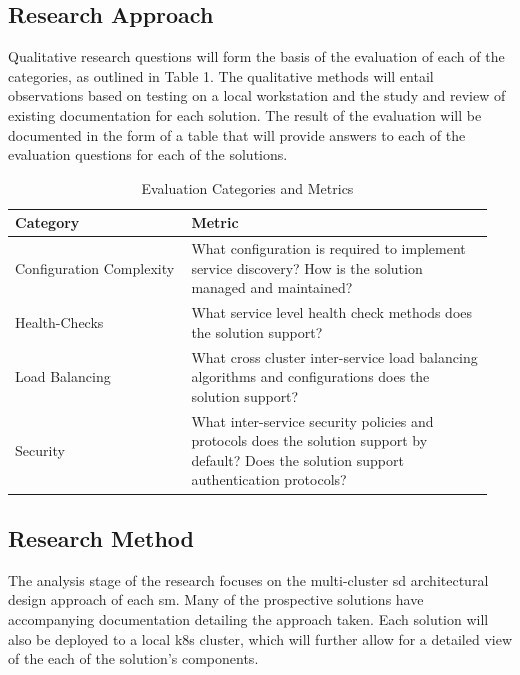 \documentclass[12pt, a4paper, oneside]{article}
\begin{document}
\subsection{Research Approach}
Qualitative research questions will form the basis of the evaluation of each of the categories, as outlined in Table 1. The qualitative methods will entail observations based on testing on a local workstation and the study and review of existing documentation for each solution. The result of the evaluation will be documented in the form of a table that will provide answers to each of the evaluation questions for each of the solutions.
\begin{table}[ht]
	\centering
	\begin{tabular}{p{0.35\linewidth} | p{0.6\linewidth}}
		\textbf{Category}        & \textbf{Metric}                                                                                                                                \\ \hline
		Configuration Complexity & What configuration is required to implement service discovery? How is the solution managed and maintained?                             \\ \hline
		Health-Checks            & What service level health check methods does the solution support?                                                                             \\ \hline
		Load Balancing           & What cross cluster inter-service load balancing algorithms and configurations does the solution support?                                       \\ \hline
		Security                 & What inter-service security policies and protocols does the solution support by default? Does the solution support authentication protocols? \\ \hline
	\end{tabular}
	\caption{Evaluation Categories and Metrics}
	\label{tab:my_label}
\end{table}

\subsection{Research Method}
The analysis stage of the research focuses on the multi-cluster \acrshort{sd} architectural design approach of each \acrshort{sm}. Many of the prospective solutions have accompanying documentation detailing the approach taken. Each solution will also be deployed to a local \acrshort{k8s} cluster, which will further allow for a detailed view of the each of the solution’s components.
\end{document}
